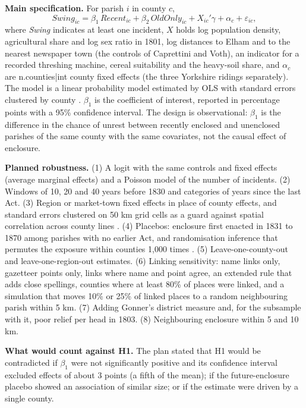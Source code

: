\documentclass[11pt,a4paper]{article}
\begin{document}
\textbf{Main specification.} For parish $i$ in county $c$,
\[ \textit{Swing}_{ic} = \beta_1\,\textit{Recent}_{ic} + \beta_2\,\textit{OldOnly}_{ic} + X_{ic}'\gamma + \alpha_c + \varepsilon_{ic}, \]
where \textit{Swing} indicates at least one incident, $X$ holds log population density, agricultural share and log sex ratio in 1801, log distances to Elham and to the nearest newspaper town (the controls of Caprettini and Voth), an indicator for a recorded threshing machine, cereal suitability and the heavy-soil share, and $\alpha_c$ are {{n.counties|int}} county fixed effects (the three Yorkshire ridings separately). The model is a linear probability model estimated by OLS with standard errors clustered by county \citep{cameronmiller2015,abadie2023}. $\beta_1$ is the coefficient of interest, reported in percentage points with a 95\% confidence interval. The design is observational: $\beta_1$ is the difference in the chance of unrest between recently enclosed and unenclosed parishes of the same county with the same covariates, not the causal effect of enclosure.

\textbf{Planned robustness.} (1) A logit with the same controls and fixed effects (average marginal effects) and a Poisson model of the number of incidents. (2) Windows of 10, 20 and 40 years before 1830 and categories of years since the last Act. (3) Region or market-town fixed effects in place of county effects, and standard errors clustered on 50 km grid cells as a guard against spatial correlation across county lines \citep{conley1999}. (4) Placebos: enclosure first enacted in 1831 to 1870 among parishes with no earlier Act, and randomisation inference that permutes the exposure within counties 1,000 times \citep{young2019}. (5) Leave-one-county-out and leave-one-region-out estimates. (6) Linking sensitivity: name links only, gazetteer points only, links where name and point agree, an extended rule that adds close spellings, counties where at least 80\% of places were linked, and a simulation that moves 10\% or 25\% of linked places to a random neighbouring parish within 5 km. (7) Adding Gonner's district measure and, for the subsample with it, poor relief per head in 1803. (8) Neighbouring enclosure within 5 and 10 km.

\textbf{What would count against H1.} The plan stated that H1 would be contradicted if $\beta_1$ were not significantly positive and its confidence interval excluded effects of about 3 points (a fifth of the mean); if the future-enclosure placebo showed an association of similar size; or if the estimate were driven by a single county.
\end{document}
